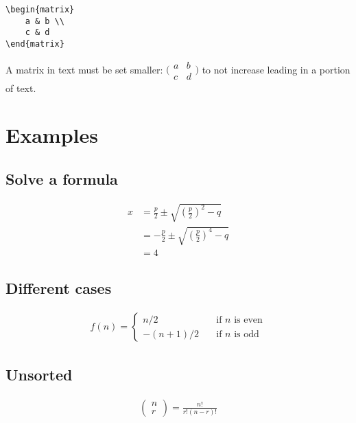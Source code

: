 \documentclass{article}
\begin{document}
\vspace{5mm}

\begin{lstlisting}[frame=single]
\begin{matrix}
	a & b \\
	c & d
\end{matrix}
\end{lstlisting}

A matrix in text must be set smaller:
$\bigl(\begin{smallmatrix}
a&b \\ c&d
\end{smallmatrix} \bigr)$
to not increase leading in a portion of text.

\section{Examples}

\subsection{Solve a formula}

\begin{align*}
	x &= \frac{p}{2} \pm \sqrt{\left( \frac{p}{2} \right)^2 - q}\\
	  &= - \frac{p}{2} \pm \sqrt{\left( \frac{p}{2} \right)^4 - q}\\
	  &= 4 
\end{align*}

\subsection{Different cases}

\begin{align*}
f(n) =
\begin{cases}
	n/2			& \quad \text{if } n \text{ is even}\\
	-(n+1)/2	& \quad \text{if } n \text{ is odd}
\end{cases}
\end{align*}

\subsection{Unsorted}

\begin{align*}
\left(
	\begin{array}{c}
		n\\
		r
	\end{array}
\right) = \frac{n!}{r!(n-r)!}
\end{align*}
\end{document}
